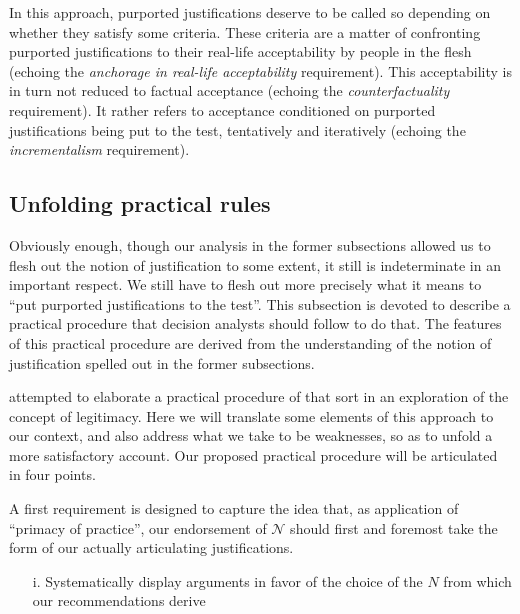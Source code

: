 \documentclass[preprint, french, english, 11pt, authoryear]{elsarticle}%
\newcommand{\adv}{\mathscr{N}}
\begin{document}
In this approach, purported justifications deserve to be called so depending on whether they satisfy some criteria. These criteria are a matter of confronting purported justifications to their real-life acceptability by people in the flesh (echoing the \emph{anchorage in real-life acceptability} requirement). This acceptability is in turn not reduced to factual acceptance (echoing the \emph{counterfactuality} requirement). It rather refers to acceptance conditioned on purported justifications being put to the test, tentatively and iteratively (echoing the \emph{incrementalism} requirement).

\subsection{Unfolding practical rules}
Obviously enough, though our analysis in the former subsections allowed us to flesh out the notion of justification to some extent, it still is indeterminate in an important respect. We still have to flesh out more precisely what it means to ``put purported justifications to the test''. This subsection is devoted to describe a practical procedure that decision analysts should follow to do that. The features of this practical procedure are derived from the understanding of the notion of justification spelled out in the former subsections.

\citet{meinard_what_2017} attempted to elaborate a practical procedure of that sort in an exploration of the concept of legitimacy. Here we will translate some elements of this approach to our context, and also address what we take to be weaknesses, so as to unfold a more satisfactory account. Our proposed practical procedure will be articulated in four points.

A first requirement is designed to capture the idea that, as application of “primacy of practice”, our endorsement of $\adv$ should first and foremost take the form of our actually articulating justifications.

\begin{itemize}
\item[i.]	Systematically display arguments in favor of the choice of the $N$ from which our recommendations derive
\end{itemize}
\end{document}
